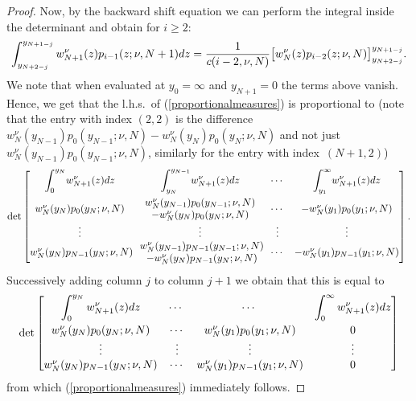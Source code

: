 \documentclass[11pt]{article}
\numberwithin{equation}{section}
\begin{document}
\begin{proof}
Now, by the backward shift equation we can perform the integral inside the determinant and obtain for $i\ge 2$:
\begin{gather*}
\int_{y_{N+2-j}}^{y_{N+1-j}}w_{N+1}^{\nu}(z)p_{i-1} (z;\nu,N+1 ){\rm d}z=\frac{1}{c(i-2,\nu,N)}\big[w_{N}^{\nu}(z)p_{i-2}(z;\nu, N)\big]^{y_{N+1-j}}_{y_{N+2-j}}.
\end{gather*}
We note that when evaluated at $y_0=\infty$ and $y_{N+1}=0$ the terms above vanish. Hence, we get that the l.h.s.\ of (\ref{proportionalmeasures}) is proportional to (note that the entry with index $(2,2)$ is the difference $w_N^{\nu}(y_{N-1})p_0(y_{N-1};\nu, N)-w_N^{\nu}(y_N)p_0(y_N;\nu, N)$ and not just $w_N^{\nu}(y_{N-1})p_0(y_{N-1};\nu, N)$, similarly for the entry with index~$(N+1,2)$)
\begin{gather*}
\det\begin{bmatrix}
\displaystyle \int_{0}^{y_N}\!w_{N+1}^{\nu}(z){\rm d}z &\displaystyle \int_{y_N}^{y_{N-1}}\!w_{N+1}^{\nu}(z){\rm d}z &\cdots &\displaystyle \int_{y_1}^{\infty}\!w_{N+1}^{\nu}(z){\rm d}z\vspace{1mm}\\
 w_N^{\nu}(y_N)p_0(y_N;\nu, N) & \begin{matrix} w_N^{\nu}(y_{N-1})p_0(y_{N-1};\nu, N)\\ -w_N^{\nu}(y_N)p_0(y_N;\nu, N)\end{matrix} &\cdots & -w_N^{\nu}(y_1)p_0(y_1;\nu, N)\\
\vdots &\vdots &\vdots &\vdots\\
 w_N^{\nu}(y_N)p_{N-1}(y_N;\nu, N)\!\! & \begin{matrix} w_N^{\nu}(y_{N-1})p_{N-1}(y_{N-1};\nu, N)\\ -w_N^{\nu}(y_N)p_{N-1}(y_N;\nu, N)\end{matrix}\!\! &\cdots & -w_N^{\nu}(y_1)p_{N-1}(y_1;\nu, N)
\end{bmatrix}.
\end{gather*}
Successively adding column $j$ to column $j+1$ we obtain that this is equal to
\begin{gather*}
\det\begin{bmatrix}
\displaystyle \int_{0}^{y_N}w_{N+1}^{\nu}(z){\rm d}z & \cdots\ &\cdots \ &\displaystyle \int_{0}^{\infty}w_{N+1}^{\nu}(z){\rm d}z\vspace{1mm}\\
 w_N^{\nu}(y_N)p_0(y_N;\nu, N) &\cdots & w_N^{\nu}(y_1)p_{0}(y_1;\nu, N) & 0\\
\vdots &\vdots &\vdots &\vdots\\
 w_N^{\nu}(y_N)p_{N-1}(y_N;\nu, N) & \cdots & w_N^{\nu}(y_1)p_{N-1}(y_1;\nu, N) & 0
\end{bmatrix}
\end{gather*}
from which (\ref{proportionalmeasures}) immediately follows.
\end{proof}
\end{document}
